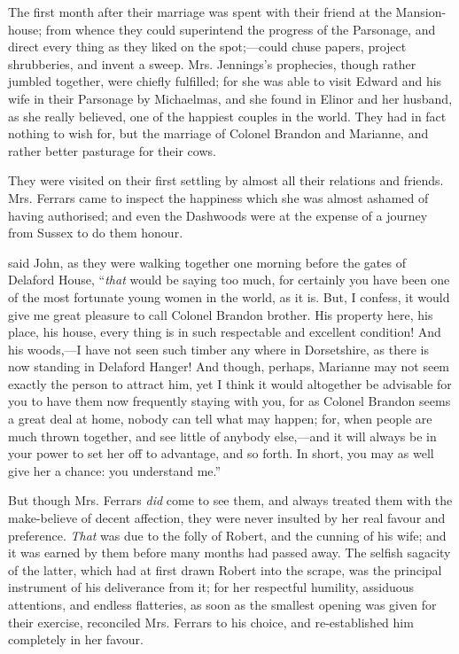 The first month after their marriage was spent with their friend at the Mansion-house; from whence they could superintend the progress of the Parsonage, and direct every thing as they liked on the spot;---could chuse papers, project shrubberies, and invent a sweep. Mrs. Jennings's prophecies, though rather jumbled together, were chiefly fulfilled; for she was able to visit Edward and his wife in their Parsonage by Michaelmas, and she found in Elinor and her husband, as she really believed, one of the happiest couples in the world. They had in fact nothing to wish for, but the marriage of Colonel Brandon and Marianne, and rather better pasturage for their cows.

They were visited on their first settling by almost all their relations and friends. Mrs. Ferrars came to inspect the happiness which she was almost ashamed of having authorised; and even the Dashwoods were at the expense of a journey from Sussex to do them honour.

 said John, as they were walking together one morning before the gates of Delaford House, “{\em that} would be saying too much, for certainly you have been one of the most fortunate young women in the world, as it is. But, I confess, it would give me great pleasure to call Colonel Brandon brother. His property here, his place, his house, every thing is in such respectable and excellent condition! And his woods,---I have not seen such timber any where in Dorsetshire, as there is now standing in Delaford Hanger! And though, perhaps, Marianne may not seem exactly the person to attract him, yet I think it would altogether be advisable for you to have them now frequently staying with you, for as Colonel Brandon seems a great deal at home, nobody can tell what may happen; for, when people are much thrown together, and see little of anybody else,---and it will always be in your power to set her off to advantage, and so forth. In short, you may as well give her a chance: you understand me.”

But though Mrs. Ferrars {\em did} come to see them, and always treated them with the make-believe of decent affection, they were never insulted by her real favour and preference. {\em That} was due to the folly of Robert, and the cunning of his wife; and it was earned by them before many months had passed away. The selfish sagacity of the latter, which had at first drawn Robert into the scrape, was the principal instrument of his deliverance from it; for her respectful humility, assiduous attentions, and endless flatteries, as soon as the smallest opening was given for their exercise, reconciled Mrs. Ferrars to his choice, and re-established him completely in her favour.

